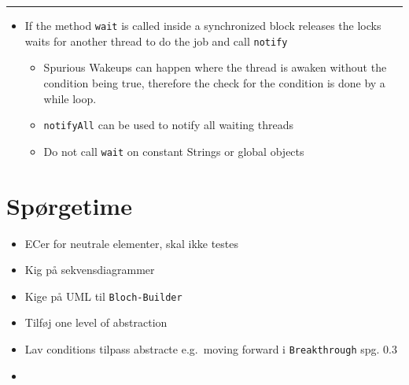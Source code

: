 \documentclass[11pt]{article}
\providecommand{\tightlist}{%
      \setlength{\itemsep}{0pt}\setlength{\parskip}{0pt}}
\begin{document}
\begin{center}\rule{0.5\linewidth}{\linethickness}\end{center}

\begin{itemize}
\tightlist
\item
  If the method \texttt{wait} is called inside a synchronized block
  releases the locks waits for another thread to do the job and call
  \texttt{notify}

  \begin{itemize}
  \tightlist
  \item
    Spurious Wakeups can happen where the thread is awaken without the
    condition being true, therefore the check for the condition is done
    by a while loop.
  \item
    \texttt{notifyAll} can be used to notify all waiting threads
  \item
    Do not call \texttt{wait} on constant Strings or global objects
  \end{itemize}
\end{itemize}

    \hypertarget{spuxf8rgetime}{%
\section{Spørgetime}\label{spuxf8rgetime}}

\begin{itemize}
\item
  ECer for neutrale elementer, skal ikke testes
\item
  Kig på sekvensdiagrammer
\item
  Kige på UML til \texttt{Bloch-Builder}
\item
  Tilføj one level of abstraction
\item
  Lav conditions tilpass abstracte e.g.~moving forward i
  \texttt{Breakthrough} spg. 0.3
\item
\end{itemize}


    
    
    
    
\end{document}
